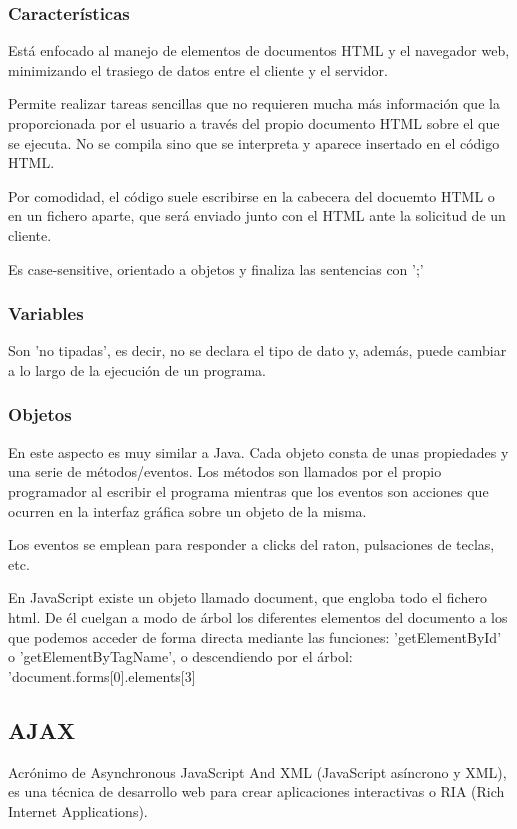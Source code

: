 \documentclass{apuntes}
\begin{document}
\subsubsection{Características}
Está enfocado al manejo de elementos de documentos HTML y el navegador web, minimizando el trasiego de datos entre el cliente y el servidor.

Permite realizar tareas sencillas que no requieren mucha más información que la proporcionada por el usuario a través del propio documento HTML sobre el que se ejecuta. No se compila sino que se interpreta y aparece insertado en el código HTML.

Por comodidad, el código suele escribirse en la cabecera del docuemto HTML o en un fichero aparte, que será enviado junto con el HTML ante la solicitud de un cliente.

Es case-sensitive, orientado a objetos y finaliza las sentencias con ';'

\subsubsection{Variables}
Son 'no tipadas', es decir, no se declara el tipo de dato y, además, puede cambiar a lo largo de la ejecución de un programa.

\subsubsection{Objetos}
En este aspecto es muy similar a Java. Cada objeto consta de unas propiedades y una serie de métodos/eventos. Los métodos son llamados por el propio programador al escribir el programa mientras que los eventos son acciones que ocurren en la interfaz gráfica sobre un objeto de la misma.

Los eventos se emplean para responder a clicks del raton, pulsaciones de teclas, etc.

En JavaScript existe un objeto llamado document, que engloba todo el fichero html. De él cuelgan a modo de árbol los diferentes elementos del documento a los que podemos acceder de forma directa mediante las funciones: 'getElementById' o 'getElementByTagName', o descendiendo por el árbol: 'document.forms[0].elements[3]

\subsection{AJAX}
\begin{defn}[AJAX]
Acrónimo de Asynchronous JavaScript And XML (JavaScript asíncrono y XML), es una técnica de desarrollo web para crear aplicaciones interactivas o RIA (Rich Internet Applications).
\end{defn}
\end{document}
